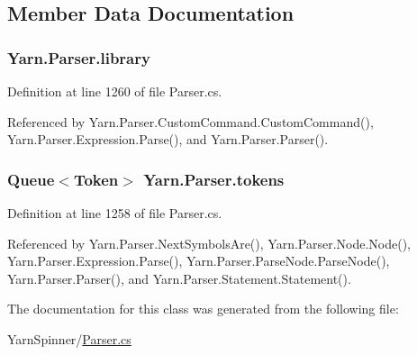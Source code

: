 \subsection{Member Data Documentation}
\hypertarget{a00151_a1313951b09177a1c83b6cf035139197a}{
\subsubsection[{library}]{ Yarn.\-Parser.\-library\hspace{0.3cm}{\ttfamily [private]}}}\label{a00151_a1313951b09177a1c83b6cf035139197a}


Definition at line 1260 of file Parser.\-cs.



Referenced by Yarn.\-Parser.\-Custom\-Command.\-Custom\-Command(), Yarn.\-Parser.\-Expression.\-Parse(), and Yarn.\-Parser.\-Parser().

\hypertarget{a00151_a1a4de646937057988b59d2ff8035eae3}{
\subsubsection[{tokens}]{\setlength{\rightskip}{0pt plus 5cm}Queue$<${\bf Token}$>$ Yarn.\-Parser.\-tokens\hspace{0.3cm}{\ttfamily [private]}}}\label{a00151_a1a4de646937057988b59d2ff8035eae3}


Definition at line 1258 of file Parser.\-cs.



Referenced by Yarn.\-Parser.\-Next\-Symbols\-Are(), Yarn.\-Parser.\-Node.\-Node(), Yarn.\-Parser.\-Expression.\-Parse(), Yarn.\-Parser.\-Parse\-Node.\-Parse\-Node(), Yarn.\-Parser.\-Parser(), and Yarn.\-Parser.\-Statement.\-Statement().



The documentation for this class was generated from the following file\-:\begin{DoxyCompactItemize}
\item 
Yarn\-Spinner/\hyperlink{a00316}{Parser.\-cs}\end{DoxyCompactItemize}
